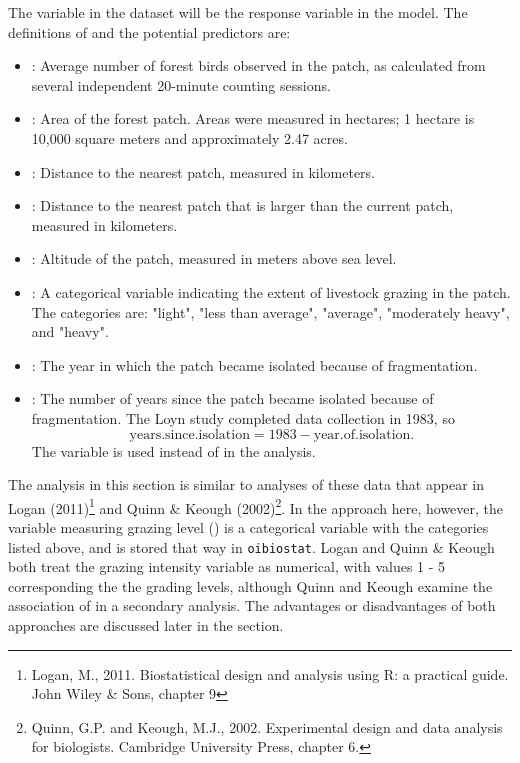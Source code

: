 The variable  in the dataset  will be the response variable in the model.  The definitions of  and the potential predictors are: 

\begin{itemize}

  \item {}:  Average number of forest birds observed in the patch, as calculated from several independent 20-minute counting sessions. 

  \item {}:  Area of the forest patch. Areas were measured in hectares; 1 hectare is 10,000 square meters and approximately 2.47 acres.

  \item {}: Distance to the nearest patch, measured in kilometers.

  \item {}: Distance to the nearest patch that is larger than the current patch, measured in kilometers.

  \item {}: Altitude of the patch, measured in meters above sea level.

  \item {}: A categorical variable indicating the extent of livestock grazing in the patch. The categories are: "light", "less than average", "average", "moderately heavy", and "heavy". 

  \item {}: The year in which the patch became isolated because of fragmentation.

  \item {}: The number of years since the patch became isolated because of fragmentation.  The Loyn study completed data collection in 1983, so 
  \[
     \text{years.since.isolation} = 1983 - \text{year.of.isolation}.
  \] 
The variable  is used instead of  in the analysis.

\end{itemize}

 
The analysis in this section is similar to analyses of these data that appear in Logan (2011)\footnote{Logan, M., 2011. Biostatistical design and analysis using R: a practical guide. John Wiley \& Sons, chapter 9} and Quinn \& Keough (2002)\footnote{Quinn, G.P. and Keough, M.J., 2002. Experimental design and data analysis for biologists. Cambridge University Press, chapter 6.}.  In the approach here, however, the variable measuring grazing level () is a categorical variable with the categories listed above, and is stored that way in \texttt{oibiostat}.  Logan and Quinn \& Keough both treat the grazing intensity variable as numerical, with values 1 - 5 corresponding the the grading levels, although Quinn and Keough examine the association of  in a secondary analysis. The advantages or disadvantages of both approaches are discussed later in the section.

